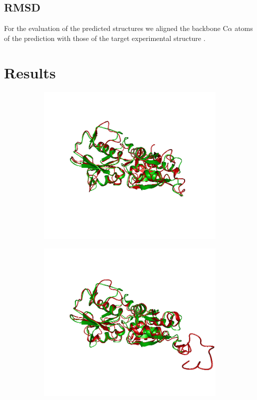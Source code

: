 \documentclass[11pt,a4paper]{article}
\renewcommand{\(}{\left (}
\renewcommand{\)}{\right )}
\begin{document}
\subsection{RMSD}
For the evaluation of the predicted structures we aligned the backbone C$\alpha$ atoms of the prediction with those of the target experimental structure \citep{pdb}. 


\section{Results}
\begin{figure}[!h]
	\begin{subfigure}{.5\textwidth}
		\includegraphics[width=\textwidth]{figures/T0762TS008}
		\subcaption{}
	\end{subfigure}
	\begin{subfigure}{.5\textwidth}
		\includegraphics[width=\textwidth]{figures/T0762TS251}

\end{subfigure}
\end{figure}
\end{document}
